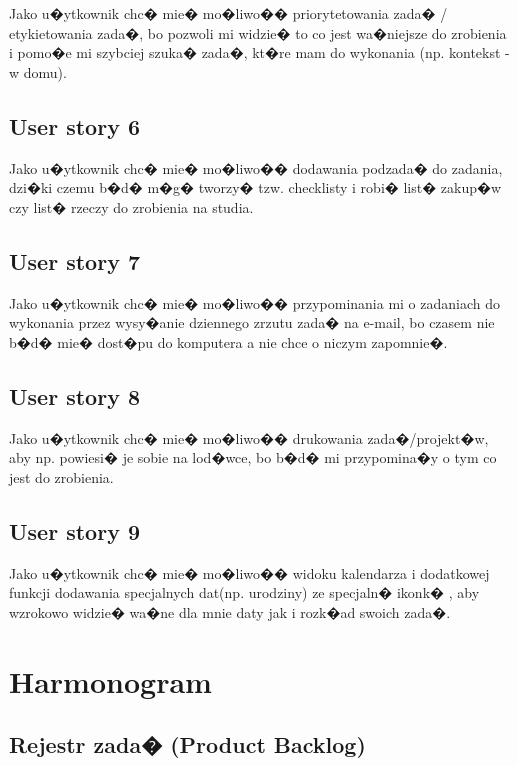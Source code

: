 ﻿\documentclass[a4paper]{article}
\begin{document}
Jako u�ytkownik chc� mie� mo�liwo�� priorytetowania zada� / etykietowania zada�, bo pozwoli mi widzie� to co jest wa�niejsze do zrobienia i pomo�e mi szybciej szuka� zada�, kt�re mam do wykonania (np. kontekst - w domu).

\subsection{User story 6}
\label{subsec:UserStory6}

Jako u�ytkownik chc� mie� mo�liwo�� dodawania podzada� do zadania, dzi�ki czemu b�d� m�g� tworzy� tzw. checklisty i robi� list� zakup�w czy list� rzeczy do zrobienia na studia.

\subsection{User story 7}
\label{subsec:UserStory7}

Jako u�ytkownik chc� mie� mo�liwo�� przypominania mi o zadaniach do wykonania  przez wysy�anie dziennego zrzutu zada� na e-mail, bo czasem nie b�d� mie� dost�pu do komputera a nie chce o niczym zapomnie�.

\subsection{User story 8}
\label{subsec:UserStory8}

Jako u�ytkownik chc� mie� mo�liwo�� drukowania zada�/projekt�w, aby np. powiesi� je sobie na lod�wce, bo b�d� mi przypomina�y o tym co jest do zrobienia.

\subsection{User story 9}
\label{subsec:UserStory9}

Jako u�ytkownik chc� mie� mo�liwo�� widoku kalendarza i dodatkowej funkcji dodawania specjalnych dat(np. urodziny) ze specjaln� ikonk� , aby wzrokowo widzie� wa�ne dla mnie daty jak i rozk�ad swoich zada�.


\newpage
\section{Harmonogram}
\label{sec:Harmonogram}

\subsection{Rejestr zada� (Product Backlog)}
\label{subsec:RejestrZadan}
\end{document}
